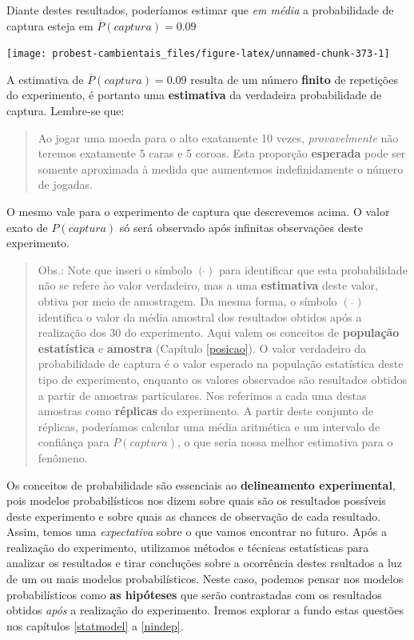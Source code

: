 \documentclass[
]{book}
\begin{document}
Diante destes resultados, poderíamos estimar que \emph{em média} a probabilidade de captura esteja em \(\overline{P}(captura) = 0.09\)

\begin{center}\texttt{[image: probest-cambientais\_files/figure-latex/unnamed-chunk-373-1]} \end{center}

A estimativa de \(\overline{P}(captura) = 0.09\) resulta de um número \textbf{finito} de repetições do experimento, é portanto uma \textbf{estimativa} da verdadeira probabilidade de captura. Lembre-se que:

\begin{quote}
Ao jogar uma moeda para o alto exatamente 10 vezes, \emph{provavelmente} não teremos exatamente 5 caras e 5 coroas. Esta proporção \textbf{esperada} pode ser somente aproximada à medida que aumentemos indefinidamente o número de jogadas.
\end{quote}

O mesmo vale para o experimento de captura que descrevemos acima. O valor exato de \(P(captura)\) só será observado após infinitas observações deste experimento.

\begin{quote}
Obs.: Note que inseri o símbolo \((\hat{})\) para identificar que esta probabilidade não se refere ào valor verdadeiro, mas a uma \textbf{estimativa} deste valor, obtiva por meio de amostragem. Da mesma forma, o símbolo \((\overline{})\) identifica o valor da média amostral dos resultados obtidos após a realização dos 30 do experimento. Aqui valem os conceitos de \textbf{população estatística} e \textbf{amostra} (Capítulo \ref{posicao}). O valor verdadeiro da probabilidade de captura é o valor esperado na população estatística deste tipo de experimento, enquanto os valores observados são resultados obtidos a partir de amostras particulares. Nos referimos a cada uma destas amostras como \textbf{réplicas} do experimento. A partir deste conjunto de réplicas, poderíamos calcular uma média aritmética e um intervalo de confiânça para \(P(captura)\), o que seria nossa melhor estimativa para o fenômeno.
\end{quote}

Os conceitos de probabilidade são essenciais ao \textbf{delineamento experimental}, pois modelos probabilísticos nos dizem sobre quais são os resultados possíveis deste experimento e sobre quais as chances de observação de cada resultado. Assim, temos uma \emph{expectativa} sobre o que vamos encontrar no futuro. Após a realização do experimento, utilizamos métodos e técnicas estatísticas para analizar os resultados e tirar concluções sobre a ocorrência destes rsultados a luz de um ou mais modelos probabilísticos. Neste caso, podemos pensar nos modelos probabilísticos como \textbf{as hipóteses} que serão contrastadas com os resultados obtidos \emph{após} a realização do experimento. Iremos explorar a fundo estas questões nos capítulos \ref{statmodel} a \ref{nindep}.
\end{document}
